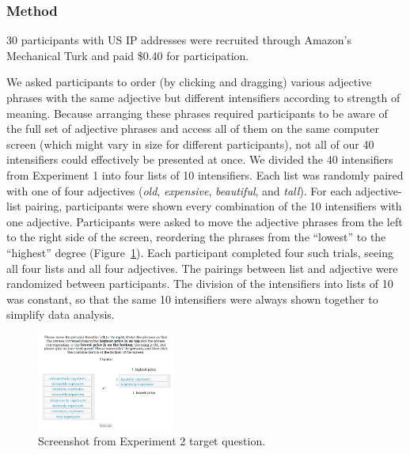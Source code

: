 \documentclass[a4paper,10pt]{article}
\newcommand{\w}[1]{\emph{#1}}
\begin{document}
    \subsubsection{Method}
      30 participants with US IP addresses were recruited through Amazon's Mechanical Turk and paid \$0.40 for  participation.

      We asked participants to order (by clicking and dragging) various adjective phrases with the same adjective but different intensifiers according to strength of meaning. Because arranging these phrases required participants to be aware of the full set of adjective phrases and access all of them on the same computer screen (which might vary in size for different participants), not all of our 40 intensifiers could effectively be presented at once. We divided the 40 intensifiers from Experiment 1 into four lists of 10 intensifiers. 
      Each list was randomly paired with one of four adjectives (\w{old}, \w{expensive}, \w{beautiful}, and \w{tall}).
      For each adjective-list pairing, participants were shown every combination of the 10 intensifiers with one adjective.
      Participants were asked to move the adjective phrases from the left to the right side of the screen, reordering the phrases from the ``lowest'' to the ``highest'' degree (Figure~\ref{exp2-q}).
      Each participant completed four such trials, seeing all four lists and all four adjectives.
      The pairings between list and adjective were randomized between participants.
      The division of the intensifiers into lists of 10 was constant, so that the same 10 intensifiers were always shown together to simplify data analysis.

      \begin{figure}[ht]
      \begin{center}
      \includegraphics[width=0.4\textwidth]{exp2-q.png}
      \end{center}
      \caption{Screenshot from Experiment 2 target question.} 
      \label{exp2-q}
      \end{figure}
      
\end{document}
